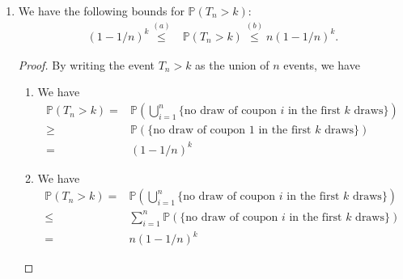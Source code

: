 \documentclass[11pt,a4paper]{article}
\numberwithin{equation}{section}%
\begin{document}
\begin{enumerate}[topsep=2pt,itemsep=2pt]
    \item We have the following bounds for $ \mathbb{P}\left( T_n > k \right)  $:
        \begin{align*}
            (1-1/n)^k \mathop{ \leq  }\limits^{(a)}  & \mathbb{P}\left( T_n > k \right) \mathop{ \leq  }\limits^{(b)} n(1-1/n)^{k} .
        \end{align*}

        \begin{proof}
            By writing the event $ T_n > k $ as the union of $ n $ events, we have
            \begin{enumerate}[topsep=2pt,itemsep=2pt]
                \item We have
                \begin{align*}
                    \mathbb{P}\left( T_n > k \right)= &\mathbb{P}\left( \bigcup _{i=1}^n \big\{ \text{no draw of coupon }i\text{ in the first }k\text{ draws} \big\} \right) \\
                    \geq & \mathbb{P}\left(  \big\{ \text{no draw of coupon }1\text{ in the first }k\text{ draws} \big\} \right) \\
                    = & \left( 1-1/n \right)^k
                \end{align*}
                \item We have
                \begin{align*}
                    \mathbb{P}\left( T_n > k \right)= &\mathbb{P}\left( \bigcup _{i=1}^n \big\{ \text{no draw of coupon }i\text{ in the first }k\text{ draws} \big\} \right) \\
                    \leq & \sum_{i=1}^n \mathbb{P}\left( \big\{ \text{no draw of coupon }i\text{ in the first }k\text{ draws} \big\} \right) \\
                    = & n\left( 1-1/n \right)^k
                \end{align*}
            \end{enumerate}
        \end{proof}


\end{enumerate}
\end{document}
